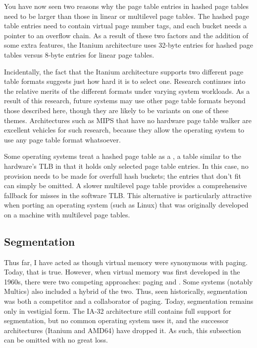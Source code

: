 You have now seen two reasons why the page table entries in hashed
page tables need to be larger than those in linear or multilevel page
tables.  The hashed page table entries need to contain virtual page
number tags, and each bucket needs a pointer to an
overflow chain. As a
result of these two factors and the addition of some extra features,
the Itanium architecture uses 32-byte entries for hashed page tables
versus 8-byte entries for linear page tables.

Incidentally, the fact that the Itanium architecture supports two
different page table formats suggests just how hard it is to select
one.  Research continues into the relative merits of the different
formats under varying system workloads.  As a result of this research,
future systems may use other page table formats beyond those described
here, though they are likely to be variants on one of these themes.
Architectures such as MIPS that have no hardware page table walker are
excellent vehicles for such research, because they allow the operating
system to use any page table format whatsoever.

Some operating systems treat a hashed page table as a
, a table similar to the hardware's TLB in
that it holds only selected page table entries.  In this case, no
provision needs to be made for overfull hash buckets; the entries
that don't fit can simply be omitted.  A slower multilevel page table
provides a comprehensive fallback for misses in the software TLB.
This alternative is particularly
attractive when porting an operating system (such as Linux) that was
originally developed on a machine with multilevel page tables.

\subsection{Segmentation}\label{vm-segmentation-section}

Thus far, I have acted as though virtual memory were synonymous with
paging.  Today, that is true.  However, when virtual memory was first
developed in the 1960s, there were two competing approaches: paging
and .  Some systems (notably Multics) also included a
hybrid of the two.  Thus, seen historically, segmentation was both a
competitor and a collaborator of paging.  Today, segmentation remains
only in vestigial form.  The IA-32 architecture still contains full
support for segmentation, but no common operating system uses it, and
the successor architectures (Itanium and AMD64) have dropped it.  As
such, this subsection can be omitted with no great loss.

